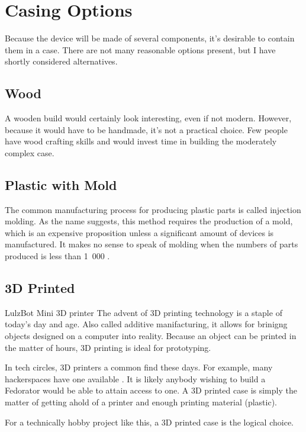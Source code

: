     \section{Casing Options}
        Because the device will be made of several components, it's desirable to contain them in a case.  There are not many reasonable options present, but I have shortly considered alternatives.
        \subsection{Wood}
            A wooden build would certainly look interesting, even if not modern.  However, because it would have to be handmade, it's not a practical choice.  Few people have wood crafting skills and would invest time in building the moderately complex case.
        
        \subsection{Plastic with Mold}
            The common manufacturing process for producing plastic parts is called injection molding.  As the name suggests, this method requires the production of a mold, which is an expensive proposition unless a significant amount of devices is manufactured.  It makes no sense to speak of molding when the numbers of parts produced is less than 1~000 \cite{rexplastics-mold-price}.
            
        \subsection{3D Printed}
                {LulzBot Mini 3D printer \cite{lulzbot-mini}}
            The advent of 3D printing technology is a staple of today's day and age.  Also called additive manifacturing, it allows for brinigng objects designed on a computer into reality.  Because an object can be printed in the matter of hours, 3D printing is ideal for prototyping.
            
            In tech circles, 3D printers a common find these days.  For example, many hackerspaces have one available \cite{hackerspaces-3d-printers}. It is likely anybody wishing to build a Fedorator would be able to attain access to one.  A 3D printed case is simply the matter of getting ahold of a printer and enough printing material (plastic).
            
            For a technically hobby project like this, a 3D printed case is the logical choice.
            
